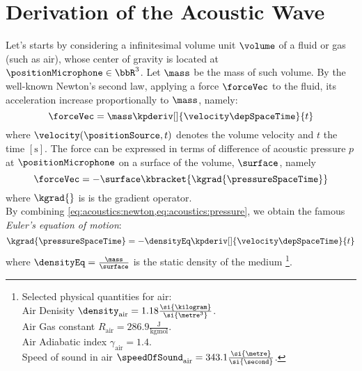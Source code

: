 \chapter{Derivation of the Acoustic Wave}\label{ap:roomAcoustics}
Let's starts by considering a infinitesimal volume unit $\volume$ of a fluid or gas (such as air),
whose center of gravity is located at $\positionMicrophone \in \bbR^3$.
Let $\mass$ be the mass of such volume.
By the well-known Newton's second law, applying a force $\forceVec$ to the fluid, its acceleration increase proportionally to $\mass$,
namely:
\begin{equation}
    \label{eq:acoustics:newton}
    \forceVec = \mass \kpderiv[]{\velocity\depSpaceTime}{t}
\end{equation}
where $\velocity(\positionSource, t)$ denotes the volume velocity and $t$ the time $[\si{\second}]$.
The force can be expressed in terms of difference of acoustic pressure $p$ at $\positionMicrophone$ on a surface of the volume, $\surface$, namely
\begin{equation}
    \label{eq:acoustics:pressure}
    \forceVec = - \surface \kbracket{\kgrad{\pressureSpaceTime}}
\end{equation}
where $\kgrad{}$ is is the gradient operator.
\\By combining \cref{eq:acoustics:newton,eq:acoustics:pressure}, we obtain the famous \textit{Euler's equation of motion}:
\begin{equation}
    \label{eq:acoustics:euler}
    \kgrad{\pressureSpaceTime} = - \densityEq \kpderiv[]{\velocity\depSpaceTime}{t}
\end{equation}
where $\densityEq = \frac{\mass}{\surface}$ is the static density of the medium
\footnote{%
\label{fn:acoustics:airconstanc}
Selected physical quantities for air:
\\Air Denisity $\density_{\text{air}} = 1.18 \tfrac{\si{\kilogram}}{\si{\metre^3}}$.
\\Air Gas constant $R_{\text{air}} = 286.9 \tfrac{\si{\joule}}{\si{\kilogram} \si{\mole}}$.
\\Air Adiabatic index $\gamma_{\text{air}} = 1.4$.
\\Speed of sound in air $\speedOfSound_{\text{air}} = 343.1 \tfrac{\si{\metre}}{\si{\second}}$.
}.

